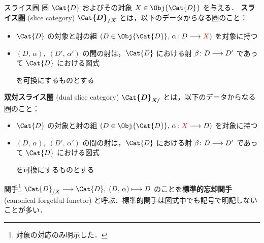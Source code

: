 \documentclass[TQFT_main]{subfiles}
\begin{document}
\begin{mydef}[label=def:slice-category]{スライス圏}
    圏 $\Cat{D}$ およびその対象 $X \in \Obj{\Cat{D}}$ を与える．
    \textbf{スライス圏} (slice category) $\bm{\Cat{D}_{/X}}$ とは，以下のデータからなる圏のこと：
    \begin{itemize}
        \item $\Cat{D}$ の対象と射の組 $(D \in \Obj{\Cat{D}},\, \alpha \colon D \lto \textcolor{red}{X})$ を対象に持つ
        \item $(D,\, \alpha),\; (D',\, \alpha')$ の間の射は，$\Cat{D}$ における射 $\beta \colon D \longrightarrow D'$ であって $\Cat{D}$ における図式
        \begin{center}
        \end{center}
        を可換にするものとする
    \end{itemize}
    
    \tcblower 

    \textbf{双対スライス圏} (dual slice category) $\bm{\Cat{D}_{X/}}$ とは，以下のデータからなる圏のこと：
    \begin{itemize}
        \item $\Cat{D}$ の対象と射の組 $(D \in \Obj{\Cat{D}},\, \alpha \colon \textcolor{red}{X} \lto D)$ を対象に持つ
        \item $(D,\, \alpha),\; (D',\, \alpha')$ の間の射は，$\Cat{D}$ における射 $\beta \colon D \longrightarrow D'$ であって $\Cat{D}$ における図式
        \begin{center}
        \end{center}
        を可換にするものとする
    \end{itemize}
\end{mydef}

関手\footnote{対象の対応のみ明示した．} $\Cat{D}_{/X} \lto \Cat{D},\; (D,\, \alpha) \lmto D$ のことを\textbf{標準的忘却関手} (canonical forgetful functor) と呼ぶ．標準的関手は図式中でも記号で明記しないことが多い．
\end{document}
